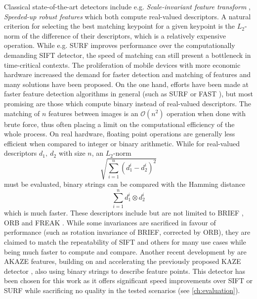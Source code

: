 Classical state-of-the-art detectors include e.g. \emph{Scale-invariant feature
transform} \citep{lowe1999}, \emph{Speeded-up robust features}
\citep{bay2006} which both compute real-valued descriptors. A natural criterion
for selecting the best matching keypoint for a given keypoint is the $L_2$-norm
of the difference of their descriptors, which is a relatively expensive
operation. While e.g. SURF improves performance over the computationally
demanding SIFT detector, the speed of matching can still present a bottleneck in
time-critical contexts. The proliferation of mobile devices with more economic
hardware increased the demand for faster detection and matching of features and
many solutions have been proposed. On the one hand, efforts have been made at
faster feature detection algorithms in general (such as SURF or FAST
\citep{rosten2005}), but most promising are those which compute binary instead
of real-valued descriptors. The matching of $n$ features between images is an
$\mathcal{O}(n^2)$ operation when done with brute force, thus often placing a
limit on the computational efficiency of the whole process. On real hardware,
floating point operations are generally less efficient when compared to integer
or binary arithmetic. While for real-valued descriptors $d_1,~d_2$ with size $n$,
an $L_2$-norm 
\begin{equation*}
   \sqrt{\sum_{i=1}^n (d_1^i - d_2^i)^2}
\end{equation*}
must be evaluated,
binary strings can be compared with the Hamming distance 
\begin{equation*}
   \sum_{i=1}^n d_1^i \otimes d_2^i   
\end{equation*}
which is much faster. These descriptors include but are not limited to BRIEF
\citep[Binary Robust Independent Elementary Features]{calonder2010}, ORB
\citep[Oriented BRIEF]{rublee2011} and FREAK \citep[Fast Retina
Keypoint]{ortiz2012}. While some invariances are sacrificed in favour of
performance (such as rotation invariance of BRIEF, corrected by ORB), they are
claimed to match the repeatability of SIFT and others for many use cases while
being much faster to compute and compare. Another recent development by
\citet{alcantarilla2013} are AKAZE features, building on and accelerating the
previously proposed KAZE detector \citep{alcantarilla2012}, also using binary
strings to describe feature points. This detector has been chosen for this work
as it offers significant speed improvements over SIFT or SURF while sacrificing
no quality in the tested scenarios (see \autoref{ch:evaluation}).

